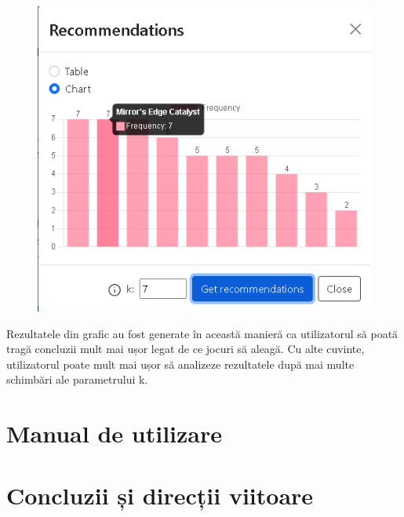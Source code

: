 \documentclass[12pt,a4paper]{report}
\begin{document}
\begin{figure}[H]
\centering
\caption{}
\begin{adjustbox}{max size={\textwidth}{\textheight}}
\includegraphics[scale=1]{exemplu_40_modal_4}
\end{adjustbox}
\caption*{}
\end{figure}

Rezultatele din grafic au fost generate în această manieră ca utilizatorul să poată tragă concluzii mult mai ușor legat de ce jocuri să aleagă. Cu alte cuvinte, utilizatorul poate mult mai ușor să analizeze rezultatele după mai multe schimbări ale parametrului k.




\section{Manual de utilizare}
\section{Concluzii și direcții viitoare}
\end{document}
